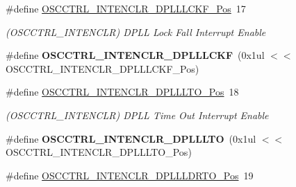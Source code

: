 \begin{DoxyCompactItemize}
\item 
\hypertarget{group___s_a_m_l21___o_s_c_c_t_r_l_gaa2fe1dd92afda4cc36bd2791df937ccd}{}\#define \hyperlink{group___s_a_m_l21___o_s_c_c_t_r_l_gaa2fe1dd92afda4cc36bd2791df937ccd}{O\+S\+C\+C\+T\+R\+L\+\_\+\+I\+N\+T\+E\+N\+C\+L\+R\+\_\+\+D\+P\+L\+L\+L\+C\+K\+F\+\_\+\+Pos}~17\label{group___s_a_m_l21___o_s_c_c_t_r_l_gaa2fe1dd92afda4cc36bd2791df937ccd}

\begin{DoxyCompactList}\small\item\em (O\+S\+C\+C\+T\+R\+L\+\_\+\+I\+N\+T\+E\+N\+C\+L\+R) D\+P\+L\+L Lock Fall Interrupt Enable \end{DoxyCompactList}\item 
\hypertarget{group___s_a_m_l21___o_s_c_c_t_r_l_gab78b4f588f41c0d4b81d3a7d080bed90}{}\#define {\bfseries O\+S\+C\+C\+T\+R\+L\+\_\+\+I\+N\+T\+E\+N\+C\+L\+R\+\_\+\+D\+P\+L\+L\+L\+C\+K\+F}~(0x1ul $<$$<$ O\+S\+C\+C\+T\+R\+L\+\_\+\+I\+N\+T\+E\+N\+C\+L\+R\+\_\+\+D\+P\+L\+L\+L\+C\+K\+F\+\_\+\+Pos)\label{group___s_a_m_l21___o_s_c_c_t_r_l_gab78b4f588f41c0d4b81d3a7d080bed90}

\item 
\hypertarget{group___s_a_m_l21___o_s_c_c_t_r_l_ga035cd8fe2e062cfadd507565c59e9b34}{}\#define \hyperlink{group___s_a_m_l21___o_s_c_c_t_r_l_ga035cd8fe2e062cfadd507565c59e9b34}{O\+S\+C\+C\+T\+R\+L\+\_\+\+I\+N\+T\+E\+N\+C\+L\+R\+\_\+\+D\+P\+L\+L\+L\+T\+O\+\_\+\+Pos}~18\label{group___s_a_m_l21___o_s_c_c_t_r_l_ga035cd8fe2e062cfadd507565c59e9b34}

\begin{DoxyCompactList}\small\item\em (O\+S\+C\+C\+T\+R\+L\+\_\+\+I\+N\+T\+E\+N\+C\+L\+R) D\+P\+L\+L Time Out Interrupt Enable \end{DoxyCompactList}\item 
\hypertarget{group___s_a_m_l21___o_s_c_c_t_r_l_gaabcd0372e4797da183466d4a0e0c3aa1}{}\#define {\bfseries O\+S\+C\+C\+T\+R\+L\+\_\+\+I\+N\+T\+E\+N\+C\+L\+R\+\_\+\+D\+P\+L\+L\+L\+T\+O}~(0x1ul $<$$<$ O\+S\+C\+C\+T\+R\+L\+\_\+\+I\+N\+T\+E\+N\+C\+L\+R\+\_\+\+D\+P\+L\+L\+L\+T\+O\+\_\+\+Pos)\label{group___s_a_m_l21___o_s_c_c_t_r_l_gaabcd0372e4797da183466d4a0e0c3aa1}

\item 
\hypertarget{group___s_a_m_l21___o_s_c_c_t_r_l_ga8a65a5194c9cbdb205a21fc562442f59}{}\#define \hyperlink{group___s_a_m_l21___o_s_c_c_t_r_l_ga8a65a5194c9cbdb205a21fc562442f59}{O\+S\+C\+C\+T\+R\+L\+\_\+\+I\+N\+T\+E\+N\+C\+L\+R\+\_\+\+D\+P\+L\+L\+L\+D\+R\+T\+O\+\_\+\+Pos}~19\label{group___s_a_m_l21___o_s_c_c_t_r_l_ga8a65a5194c9cbdb205a21fc562442f59}


\end{DoxyCompactItemize}
